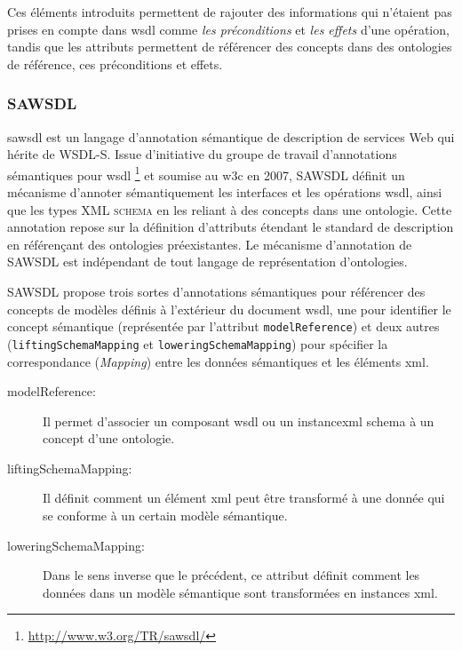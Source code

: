     Ces éléments introduits permettent de rajouter des informations
    qui n'étaient pas prises en compte dans \acrshort{wsdl} comme
    \emph{les préconditions} et \emph{les effets} d'une opération,
    tandis que les attributs permettent de référencer des concepts
    dans des ontologies de référence, ces préconditions et effets.

    \subsubsection{SAWSDL}
    \acrshort{sawsdl} \cite{kopecky2007sawsdl} est un langage
    d'annotation sémantique de description de services Web qui hérite
    de \textsc{WSDL-S}. Issue d'initiative du groupe de travail
    d'annotations sémantiques pour \acrshort{wsdl}
    \footnote{\url{http://www.w3.org/TR/sawsdl/}} et soumise au
    \acrshort{w3c} en 2007, \textsc{SAWSDL} définit un mécanisme
    d'annoter sémantiquement les interfaces et les opérations
    \acrshort{wsdl}, ainsi que les types \textsc{XML schema} en les
    reliant à des concepts dans une ontologie. Cette annotation repose
    sur la définition d'attributs étendant le standard de description
    en référençant des ontologies préexistantes. Le mécanisme
    d'annotation de \textsc{SAWSDL} est indépendant de tout langage de
    représentation \cite{lopez2008selection} d'ontologies.\medskip

    \textsc{SAWSDL} propose trois sortes d'annotations sémantiques
    pour référencer des concepts de modèles définis à l'extérieur du
    document \acrshort{wsdl}, une pour identifier le concept
    sémantique (représentée par l'attribut \texttt{modelReference}) et
    deux autres (\texttt{liftingSchemaMapping} et
    \texttt{loweringSchemaMapping}) pour spécifier la correspondance
    (\emph{Mapping}) entre les données sémantiques et les éléments
    \acrshort{xml}.

    \renewcommand{\descriptionlabel}[1]{\hspace{0.5cm}\textbullet~\texttt{#1}}
    \begin{description}
    \item [modelReference:] Il permet d'associer un composant
      \acrshort{wsdl} ou un instance\acrshort{xml} schema à un concept
      d'une ontologie.

    \item [liftingSchemaMapping:] Il définit comment un élément
      \acrshort{xml} peut être transformé à une donnée qui se conforme
      à un certain modèle sémantique.

    \item [loweringSchemaMapping:] Dans le sens inverse que le
      précédent, ce attribut définit comment les données dans un
      modèle sémantique sont transformées en instances \acrshort{xml}.
    \end{description}
    \enddescription


